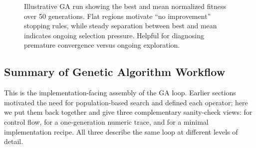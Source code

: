 \begin{figure}[t]
    \caption{Illustrative GA run showing the best and mean normalized fitness over 50 generations. Flat regions motivate ``no improvement'' stopping rules, while steady separation between best and mean indicates ongoing selection pressure. Helpful for diagnosing premature convergence versus ongoing exploration.}
    \label{fig:lec11-ga-progress}
\end{figure}


\subsection{Summary of Genetic Algorithm Workflow}
\label{sec:evo_summary_of_genetic_algorithm_workflow}

This is the implementation-facing assembly of the GA loop. Earlier sections motivated the need for population-based search and defined each operator; here we put them back together and give three complementary sanity-check views:  for control flow,  for a one-generation numeric trace, and  for a minimal implementation recipe. All three describe the same loop at different levels of detail.

